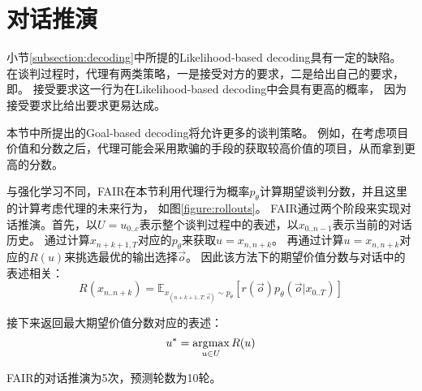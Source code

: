 \section{对话推演}
\label{section:rollout}

小节\ref{subsection:decoding}中所提的Likelihood-based decoding具有一定的缺陷。
在谈判过程时，代理有两类策略，一是接受对方的要求，二是给出自己的要求，即。
接受要求这一行为在Likelihood-based decoding中会具有更高的概率，
因为接受要求比给出要求更易达成。

本节中所提出的Goal-based decoding将允许更多的谈判策略。
例如，在考虑项目价值和分数之后，代理可能会采用欺骗的手段的获取较高价值的项目，从而拿到更高的分数。


与强化学习不同，FAIR在本节利用代理行为概率$p_\theta$计算期望谈判分数，并且这里的计算考虑代理的未来行为，
如图\ref{figure:rollouts}。
FAIR通过两个阶段来实现对话推演。首先，以$U=u_{0..c}$表示整个谈判过程中的表述，以$x_{0..n-1}$表示当前的对话历史。
通过计算$x_{n+k+1,T}$对应的$p_\theta$来获取$u=x_{n,n+k}$。
再通过计算$u=x_{n,n+k}$对应的$R(u)$来挑选最优的输出选择$\vec{o}$。
因此该方法下的期望价值分数与对话中的表述相关：
\begin{equation}
R(x_{n.. n+k})=\mathbb{E}_{x_{(n+k+1.. T;\vec{o})}\sim p_\theta}[r(\vec{o})p_\theta(\vec{o}|x_{0..T})]
\end{equation}

接下来返回最大期望价值分数对应的表述：
\begin{equation}
u^{*}=\operatorname*{\arg\!\max}_{u\in U}R(u)
\end{equation}

FAIR的对话推演为5次，预测轮数为10轮。